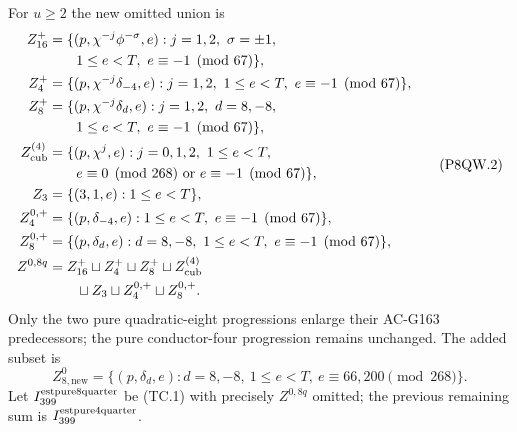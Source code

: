 For $u\geq2$ the new omitted union is
\[
 \begin{aligned}
 Z_{16}^+&=\{(p,\chi^{-j}\phi^{-\sigma},e):j=1,2,\ \sigma=\pm1,\\
 &\hspace{2em}1\leq e<T,\ e\equiv-1\pmod{67}\},\\
 Z_4^+&=\{(p,\chi^{-j}\delta_{-4},e):j=1,2,\ 1\leq e<T,
                                      \ e\equiv-1\pmod{67}\},\\
 Z_8^+&=\{(p,\chi^{-j}\delta_d,e):j=1,2,\ d=8,-8,\\
 &\hspace{2em}1\leq e<T,\ e\equiv-1\pmod{67}\},\\
 Z_{\rm cub}^{(4)}&=\{(p,\chi^j,e):j=0,1,2,\ 1\leq e<T,\\
 &\hspace{2em}e\equiv0\pmod{268}\ \text{or}\ e\equiv-1\pmod{67}\},\\
 Z_3&=\{(3,1,e):1\leq e<T\},\\
 Z_{4}^{0,+}&=\{(p,\delta_{-4},e):1\leq e<T,
                                      \ e\equiv-1\pmod{67}\},\\
 Z_{8}^{0,+}&=\{(p,\delta_d,e):d=8,-8,\ 1\leq e<T,
                                      \ e\equiv-1\pmod{67}\},\\
 Z^{0,8q}&=Z_{16}^+\sqcup Z_4^+\sqcup Z_8^+\sqcup Z_{\rm cub}^{(4)}\\
         &\hspace{2em}\sqcup Z_3\sqcup Z_4^{0,+}\sqcup Z_8^{0,+}.
 \end{aligned}
 \tag{P8QW.2}
\]
Only the two pure quadratic-eight progressions enlarge their AC-G163
predecessors; the pure conductor-four progression remains unchanged.
The added subset is
\[
 Z_{8,\mathrm{new}}^0=
 \{(p,\delta_d,e):d=8,-8,\ 1\leq e<T,
                                  \ e\equiv66,200\pmod{268}\}.
 \tag{P8QW.3}
\]
Let $I_{399}^{\rm estpure8quarter}$ be (TC.1) with precisely
$Z^{0,8q}$ omitted; the previous remaining sum is
$I_{399}^{\rm estpure4quarter}$.

